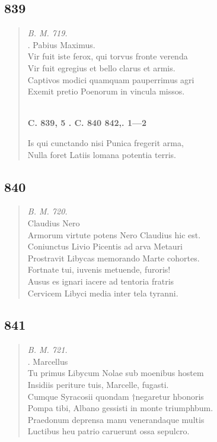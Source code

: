 \documentclass[11pt, a4paper]{report}
\begin{document}
            \subsection*{839}
      \begin{verse}
      \textit{B. M. 719.} \\ . Pabius Maximus. \\ Vir fuit iste ferox, qui torvus fronte verenda \\ Vir fuit egregius et bello clarus et armis. \\ Captivos modici quamquam pauperrimus agri \\ Exemit pretio Poenorum in vincula missos. \\ 
        ﻿\pagebreak 
     \marginpar{[304]} \begin{center} \textbf{C. 839, 5 . C. 840 842,. 1—2} \end{center}Is qui cunctando nisi Punica fregerit arma, \\ Nulla foret Latiis lomana potentia terris. \\ 
      \end{verse}
  
            \subsection*{840}
      \begin{verse}
      \textit{B. M. 720.} \\ Claudius Nero \\ Armorum virtute potens Nero Claudius hic est. \\ Coniunctus Livio Picentis ad arva Metauri \\ Prostravit Libycas memorando Marte cohortes. \\ Fortnate tui, iuvenis metuende, furoris! \\ Ausus es ignari iacere ad tentoria fratris \\ Cervicem Libyci media inter tela tyranni. \\ 
      \end{verse}
  
            \subsection*{841}
      \begin{verse}
      \textit{B. M. 721.} \\ . Marcellus \\ Tu primus Libycum Nolae sub moenibus hostem \\ Insidiis periture tuis, Marcelle, fugasti. \\ Cumque Syracosii quondam †negaretur hbonoris \\ Pompa tibi, Albano gessisti in monte triumphbum. \\ Praedonum deprensa manu venerandaque multis \\ Luctibus heu patrio caruerunt ossa sepulcro. \\ 
      \end{verse}
  
\end{document}
